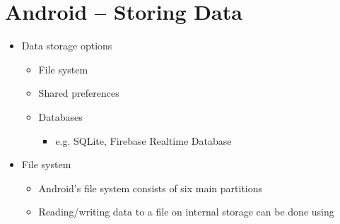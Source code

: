 %

%
\section{Android -- Storing Data}
\begin{itemize}
	\item Data storage options
	\begin{itemize}
		\item File system
		\item Shared preferences
		\item Databases
		\begin{itemize}
			\item e.g. SQLite, Firebase Realtime Database
		\end{itemize}
	\end{itemize}

	\item File system
	\begin{itemize}
		\item Android’s file system consists of six main partitions
		\item Reading/writing data to a file on internal storage can be done using
	\end{itemize}


\end{itemize}
